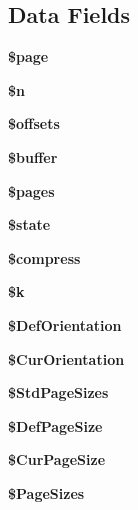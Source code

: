 \subsection*{Data Fields}
\begin{DoxyCompactItemize}
\item 
{\bfseries \$page}\label{class_f_p_d_f_a0a44e6760141442bb439b1ab1395d8ff}

\item 
{\bfseries \$n}\label{class_f_p_d_f_aa5fae90470d460a65d5211ec08e6b05c}

\item 
{\bfseries \$offsets}\label{class_f_p_d_f_a1c0c5798153818c42bcccf58deb642f0}

\item 
{\bfseries \$buffer}\label{class_f_p_d_f_af1862006a19e84e552f66189adc792ae}

\item 
{\bfseries \$pages}\label{class_f_p_d_f_a263621399c53f2952c2329ee13ad8e4e}

\item 
{\bfseries \$state}\label{class_f_p_d_f_ae82306c4f2d17d8dd5c7d8d916b33bed}

\item 
{\bfseries \$compress}\label{class_f_p_d_f_abf799de0d30288b91ee73769281dd69d}

\item 
{\bfseries \$k}\label{class_f_p_d_f_ad6726cfaa85d4b8299d2b0f034cbf178}

\item 
{\bfseries \$\+Def\+Orientation}\label{class_f_p_d_f_a7918c7480b45c7fd590a43ca125cdfe8}

\item 
{\bfseries \$\+Cur\+Orientation}\label{class_f_p_d_f_a3ee0a135fc6d6a4b2ac30e6afb7a15a7}

\item 
{\bfseries \$\+Std\+Page\+Sizes}\label{class_f_p_d_f_a2323ac5b6d548996a98dd29021aedee9}

\item 
{\bfseries \$\+Def\+Page\+Size}\label{class_f_p_d_f_a403e759d1c3233b294315918203f6ed7}

\item 
{\bfseries \$\+Cur\+Page\+Size}\label{class_f_p_d_f_a4621d0ec8fbbfbc7803f239af5f9d563}

\item 
{\bfseries \$\+Page\+Sizes}\label{class_f_p_d_f_ae0087648cba6cee3a31973c9d782a021}


\end{DoxyCompactItemize}
